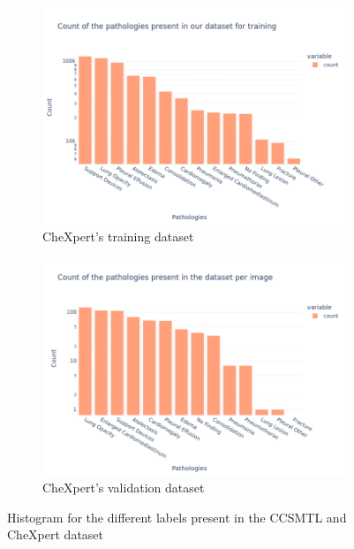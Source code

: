 \documentclass[11pt]{article}
\begin{document}
\begin{figure}[h!]
         \begin{subfigure}[b]{0.48\linewidth}
             \centering
             \includegraphics[width=\linewidth]{plots/histogram_chexpert_train}
             \caption{CheXpert's training dataset}
             \vspace{4ex}
             \label{fig:histogram_chexpert_train}
         \end{subfigure}
         \hfill
         \begin{subfigure}[b]{0.48\linewidth}
             \centering
             \includegraphics[width=\linewidth]{plots/histogram_chexpert_valid}
             \caption{CheXpert's validation dataset}
             \vspace{4ex}
             \label{fig:histogram_chexpert_valid}
         \end{subfigure}

         \caption{Histogram for the different labels present in the CCSMTL and CheXpert dataset}
         \label{fig:histogram_classes}
    \end{figure}
\end{document}
